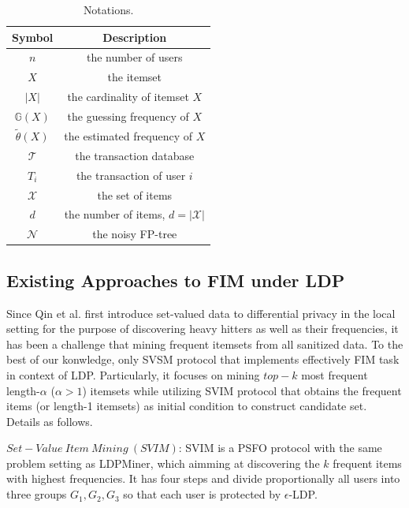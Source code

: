 \documentclass[conference]{IEEEtran}
\begin{document}
\begin{table}[!t]
\caption{Notations.}
\begin{center}
\begin{tabular}{|c|c|}\hline
  Symbol&Description \\\hline
  $n$ & the number of users \\\hline
  $X$ & the itemset \\\hline
  $|X|$ & the cardinality of itemset $X$ \\\hline
  $\mathbb{G}(X)$ & the guessing frequency of $X$ \\\hline
  $\tilde{\theta}(X)$ & the estimated frequency of $X$ \\\hline
  $\mathcal{T}$ & the transaction database \\\hline
  $T_i$ & the transaction of user $i$ \\\hline
  $\mathcal{X}$ & the set of items \\\hline
  $d$ & the number of items, $d = |\mathcal{X}|$ \\\hline
  $\mathcal{N}$ & the noisy FP-tree \\\hline

\end{tabular}
\label{notations}
\end{center}
\end{table}

\subsection{Existing Approaches to FIM under LDP}\label{svim and svsm}
Since Qin et al.\cite{a1} first introduce set-valued data to differential privacy in the local setting for the purpose of discovering heavy hitters as well as their frequencies, it has been a challenge that mining frequent itemsets from all sanitized data. To the best of our konwledge, only SVSM\cite{a2} protocol that implements effectively FIM task in context of LDP. Particularly, it focuses on mining $top-k$ most frequent length-$\alpha$ ($\alpha>1$) itemsets while utilizing SVIM\cite{a2} protocol that obtains the frequent items (or length-1 itemsets) as initial condition to construct candidate set. Details as follows. 

$Set-Value\ Item\ Mining\ (SVIM)$: SVIM is a PSFO protocol with the same problem setting as LDPMiner\cite{a1}, which aimming at discovering the $k$ frequent items with highest frequencies. It has four steps and divide proportionally all users into three groups $G_1,G_2,G_3$ so that each user is protected by $\epsilon$-LDP.
\end{document}
